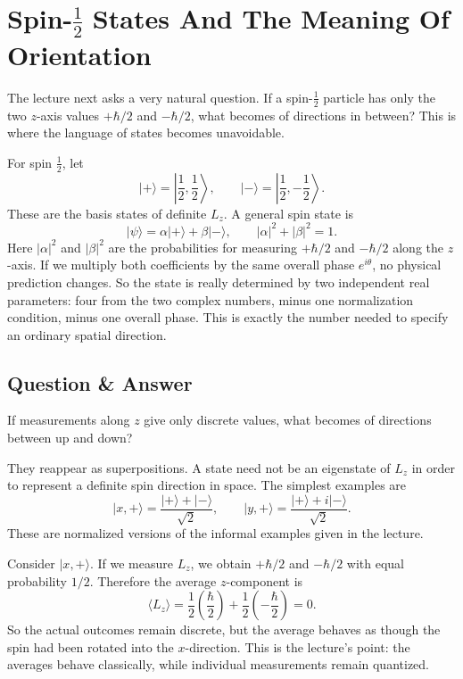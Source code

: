 \section{Spin-\texorpdfstring{$\tfrac12$}{1/2} States And The Meaning Of Orientation}

The lecture next asks a very natural question. If a spin-\(\tfrac12\) particle has only the two \(z\)-axis values \(+\hbar/2\) and \(-\hbar/2\), what becomes of directions in between? This is where the language of states becomes unavoidable.

For spin \(\tfrac12\), let
\[
\lvert+\rangle=\left\lvert \frac12,\frac12\right\rangle,\qquad
\lvert-\rangle=\left\lvert \frac12,-\frac12\right\rangle.
\]
These are the basis states of definite \(L_z\). A general spin state is
\begin{equation}
\lvert\psi\rangle=\alpha\lvert+\rangle+\beta\lvert-\rangle,
\qquad
|\alpha|^2+|\beta|^2=1.
\end{equation}
Here \(|\alpha|^2\) and \(|\beta|^2\) are the probabilities for measuring \(+\hbar/2\) and \(-\hbar/2\) along the \(z\)-axis. If we multiply both coefficients by the same overall phase \(e^{i\theta}\), no physical prediction changes. So the state is really determined by two independent real parameters: four from the two complex numbers, minus one normalization condition, minus one overall phase. This is exactly the number needed to specify an ordinary spatial direction.

\subsection{Question \& Answer}

If measurements along \(z\) give only discrete values, what becomes of directions between up and down?

They reappear as superpositions. A state need not be an eigenstate of \(L_z\) in order to represent a definite spin direction in space. The simplest examples are
\begin{equation}
\lvert x,+\rangle=\frac{\lvert+\rangle+\lvert-\rangle}{\sqrt2},
\qquad
\lvert y,+\rangle=\frac{\lvert+\rangle+i\lvert-\rangle}{\sqrt2}.
\end{equation}
These are normalized versions of the informal examples given in the lecture.

Consider \(\lvert x,+\rangle\). If we measure \(L_z\), we obtain \(+\hbar/2\) and \(-\hbar/2\) with equal probability \(1/2\). Therefore the average \(z\)-component is
\begin{equation}
\langle L_z\rangle
=
\frac12\left(\frac{\hbar}{2}\right)
+
\frac12\left(-\frac{\hbar}{2}\right)
=0.
\end{equation}
So the actual outcomes remain discrete, but the average behaves as though the spin had been rotated into the \(x\)-direction. This is the lecture's point: the averages behave classically, while individual measurements remain quantized.

